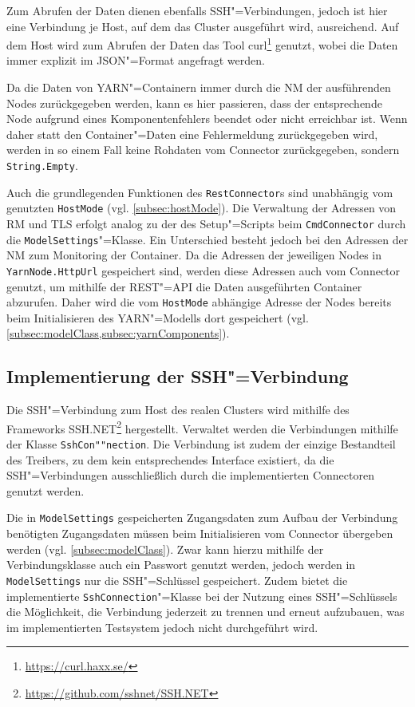 Zum Abrufen der Daten dienen ebenfalls SSH"=Verbindungen, jedoch ist hier eine Verbindung je Host, auf dem das Cluster ausgeführt wird, ausreichend.
Auf dem Host wird zum Abrufen der Daten das Tool curl\footnote{\url{https://curl.haxx.se/}} genutzt, wobei die Daten immer explizit im JSON"=Format angefragt werden.

Da die Daten von YARN"=Containern immer durch die \gls{NM} der ausführenden Nodes zurückgegeben werden, kann es hier passieren, dass der entsprechende Node aufgrund eines Komponentenfehlers beendet oder nicht erreichbar ist.
Wenn daher statt den Container"=Daten eine Fehlermeldung zurückgegeben wird, werden in so einem Fall keine Rohdaten vom Connector zurückgegeben, sondern \texttt{String.Empty}.

Auch die grundlegenden Funktionen des \texttt{RestConnector}s sind unabhängig vom genutzten \texttt{HostMode} (vgl. \cref{subsec:hostMode}).
Die Verwaltung der Adressen von \gls{RM} und \gls{TLS} erfolgt analog zu der des Setup"=Scripts beim \texttt{CmdConnector} durch die \texttt{ModelSettings}"=Klasse.
Ein Unterschied besteht jedoch bei den Adressen der \gls{NM} zum Monitoring der Container.
Da die Adressen der jeweiligen Nodes in \texttt{YarnNode.HttpUrl} gespeichert sind, werden diese Adressen auch vom Connector genutzt, um mithilfe der REST"=API die Daten ausgeführten Container abzurufen.
Daher wird die vom \texttt{HostMode} abhängige Adresse der Nodes bereits beim Initialisieren des YARN"=Modells dort gespeichert (vgl. \cref{subsec:modelClass,subsec:yarnComponents}).

\subsection{Implementierung der SSH"=Verbindung}
\label{subsec:sshConnection}

Die SSH"=Verbindung zum Host des realen Clusters wird mithilfe des Frameworks SSH.NET\footnote{\url{https://github.com/sshnet/SSH.NET}} hergestellt.
Verwaltet werden die Verbindungen mithilfe der Klasse \texttt{SshCon""nection}.
Die Verbindung ist zudem der einzige Bestandteil des Treibers, zu dem kein entsprechendes Interface existiert, da die SSH"=Verbindungen ausschließlich durch die implementierten Connectoren genutzt werden.

Die in \texttt{ModelSettings} gespeicherten Zugangsdaten zum Aufbau der Verbindung benötigten Zugangsdaten müssen beim Initialisieren vom Connector übergeben werden (vgl. \cref{subsec:modelClass}).
Zwar kann hierzu mithilfe der Verbindungsklasse auch ein Passwort genutzt werden, jedoch werden in \texttt{ModelSettings} nur die SSH"=Schlüssel gespeichert.
Zudem bietet die implementierte \texttt{SshConnection}"=Klasse bei der Nutzung eines SSH"=Schlüssels die Möglichkeit, die Verbindung jederzeit zu trennen und erneut aufzubauen, was im implementierten Testsystem jedoch nicht durchgeführt wird.

